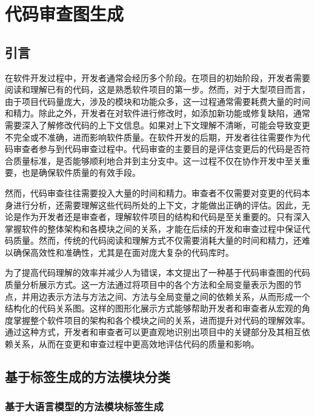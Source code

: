 

\chapter{代码审查图生成}
\section{引言}


在软件开发过程中，开发者通常会经历多个阶段。在项目的初始阶段，开发者需要阅读和理解已有的代码，这是熟悉软件项目的第一步。然而，对于大型项目而言，由于项目代码量庞大，涉及的模块和功能众多，这一过程通常需要耗费大量的时间和精力。除此之外，开发者在对软件进行修改时，如添加新功能或修复缺陷，通常需要深入了解修改代码的上下文信息。如果对上下文理解不清晰，可能会导致变更不完全或不准确，进而影响软件质量。在软件开发的后期，开发者往往需要作为代码审查者参与到代码审查过程中。代码审查的主要目的是评估变更后的代码是否符合质量标准，是否能够顺利地合并到主分支中。这一过程不仅在协作开发中至关重要，也是确保软件质量的有效手段。

然而，代码审查往往需要投入大量的时间和精力\cite{花子涵2024代码审查自动化研究综述}。审查者不仅需要对变更的代码本身进行分析，还需要理解这些代码所处的上下文，才能做出正确的评估。因此，无论是作为开发者还是审查者，理解软件项目的结构和代码是至关重要的。只有深入掌握软件的整体架构和各模块之间的关系，才能在后续的开发和审查过程中保证代码质量。然而，传统的代码阅读和理解方式不仅需要消耗大量的时间和精力，还难以确保高效性和准确性，尤其是在面对庞大复杂的代码库时。

为了提高代码理解的效率并减少人为错误，本文提出了一种基于代码审查图的代码质量分析展示方式。这一方法通过将项目中的各个方法和全局变量表示为图的节点，并用边表示方法与方法之间、方法与全局变量之间的依赖关系，从而形成一个结构化的代码关系图。这样的图形化展示方式能够帮助开发者和审查者从宏观的角度掌握整个软件项目的架构和各个模块之间的关系，进而提升对代码的理解效率。通过这种方式，开发者和审查者可以更直观地识别出项目中的关键部分及其相互依赖关系，从而在变更和审查过程中更高效地评估代码的质量和影响。

\section{基于标签生成的方法模块分类}
\subsection{基于大语言模型的方法模块标签生成}

